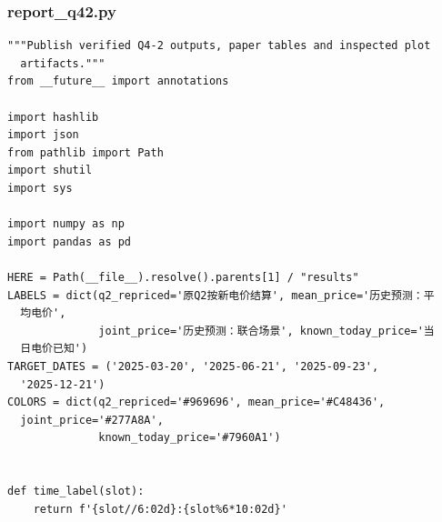 \subsubsection*{report\_q42.py}
\begin{verbatim}
"""Publish verified Q4-2 outputs, paper tables and inspected plot
  artifacts."""
from __future__ import annotations

import hashlib
import json
from pathlib import Path
import shutil
import sys

import numpy as np
import pandas as pd

HERE = Path(__file__).resolve().parents[1] / "results"
LABELS = dict(q2_repriced='原Q2按新电价结算', mean_price='历史预测：平
  均电价',
              joint_price='历史预测：联合场景', known_today_price='当
  日电价已知')
TARGET_DATES = ('2025-03-20', '2025-06-21', '2025-09-23',
  '2025-12-21')
COLORS = dict(q2_repriced='#969696', mean_price='#C48436',
  joint_price='#277A8A',
              known_today_price='#7960A1')


def time_label(slot):
    return f'{slot//6:02d}:{slot%6*10:02d}'



\end{verbatim}

